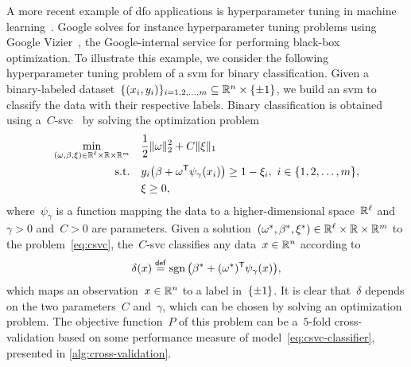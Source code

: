A more recent example of \gls{dfo} applications is hyperparameter tuning in machine learning~\cite{Ghanbari_Scheinberg_2017}.
Google solves for instance hyperparameter tuning problems using Google Vizier~\cite{Golovin_Etal_2017}, the Google-internal service for performing black-box optimization.
To illustrate this example, we consider the following hyperparameter tuning problem of a \gls{svm} for binary classification.
Given a binary-labeled dataset~$\set{(\iter_i, y_i)}_{i = 1, 2, \dots, m} \subseteq \R^n \times \set{\pm 1}$, we build an \gls{svm} to classify the data with their respective labels.
Binary classification is obtained using a~$C$-\gls{svc}~\cite{Chang_Lin_2011} by solving the optimization problem
\begin{subequations}
    \label{eq:csvc}
    \begin{align}
        \min_{(\omega, \beta, \xi) \in \R^{\ell} \times \R \times \R^m} & \quad \frac{1}{2} \norm{\omega}_2^2 + C \norm{\xi}_1\\
        \text{s.t.}                                                     & \quad y_i \big( \beta + \omega^{\T} \psi_{\gamma}(\iter_i) \big) \ge 1 - \xi_i, ~ i \in \set{1, 2, \dots, m},\\
                                                                        & \quad \xi \ge 0,
    \end{align}
\end{subequations}
where~$\psi_{\gamma}$ is a function mapping the data to a higher-dimensional space~$\mathbb{R}^{\ell}$ and~$\gamma > 0$ and~$C > 0$ are parameters.
Given a solution~$(\omega^{\ast}, \beta^{\ast}, \xi^{\ast}) \in \mathbb{R}^{\ell} \times \mathbb{R} \times \mathbb{R}^m$ to the problem~\cref{eq:csvc}, the~$C$-\gls{svc} classifies any data~$\iter \in \R^n$ according to
\begin{equation}
    \label{eq:csvc-classifier}
    \delta(\iter) \eqdef \sgn \big( \beta^{\ast} + (\omega^{\ast})^{\T} \psi_{\gamma}(\iter) \big),
\end{equation}
%
which maps an observation~$\iter \in \R^n$ to a label in~$\{\pm 1\}$.
It is clear that~$\delta$ depends on the two parameters~$C$ and~$\gamma$, which can be chosen by solving an optimization problem.
The objective function~$P$ of this problem can be a~$5$-fold cross-validation based on some performance measure of model~\cref{eq:csvc-classifier}, presented in \cref{alg:cross-validation}.

